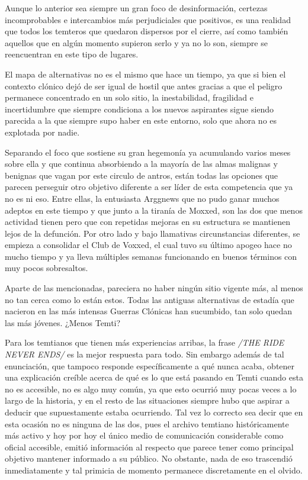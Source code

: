 \documentclass[
  spanish,
]{book}
\begin{document}
Aunque lo anterior sea siempre un gran foco de desinformación, certezas incomprobables e intercambios más perjudiciales que positivos, es una realidad que todos los temteros que quedaron dispersos por el cierre, así como también aquellos que en algún momento supieron serlo y ya no lo son, siempre se reencuentran en este tipo de lugares.

El mapa de alternativas no es el mismo que hace un tiempo, ya que si bien el contexto clónico dejó de ser igual de hostil que antes gracias a que el peligro permanece concentrado en un solo sitio, la inestabilidad, fragilidad e incertidumbre que siempre condiciona a los nuevos aspirantes sigue siendo parecida a la que siempre supo haber en este entorno, solo que ahora no es explotada por nadie.

Separando el foco que sostiene su gran hegemonía ya acumulando varios meses sobre ella y que continua absorbiendo a la mayoría de las almas malignas y benignas que vagan por este circulo de antros, están todas las opciones que parecen perseguir otro objetivo diferente a ser líder de esta competencia que ya no es ni eso. Entre ellas, la entusiasta Arggnews que no pudo ganar muchos adeptos en este tiempo y que junto a la tiranía de Moxxed, son las dos que menos actividad tienen pero que con repetidas mejoras en su estructura se mantienen lejos de la defunción. Por otro lado y bajo llamativas circunstancias diferentes, se empieza a consolidar el Club de Voxxed, el cual tuvo su último apogeo hace no mucho tiempo y ya lleva múltiples semanas funcionando en buenos términos con muy pocos sobresaltos.

Aparte de las mencionadas, pareciera no haber ningún sitio vigente más, al menos no tan cerca como lo están estos. Todas las antiguas alternativas de estadía que nacieron en las más intensas Guerras Clónicas han sucumbido, tan solo quedan las más jóvenes. ¿Menos Temti?

Para los temtianos que tienen más experiencias arribas, la frase \emph{/THE RIDE NEVER ENDS/} es la mejor respuesta para todo. Sin embargo además de tal enunciación, que tampoco responde específicamente a qué nunca acaba, obtener una explicación creíble acerca de qué es lo que está pasando en Temti cuando esta no es accesible, no es algo muy común, ya que esto ocurrió muy pocas veces a lo largo de la historia, y en el resto de las situaciones siempre hubo que aspirar a deducir que supuestamente estaba ocurriendo. Tal vez lo correcto sea decir que en esta ocasión no es ninguna de las dos, pues el archivo temtiano históricamente más activo y hoy por hoy el único medio de comunicación considerable como oficial accesible, emitió información al respecto que parece tener como principal objetivo mantener informado a su público. No obstante, nada de eso trascendió inmediatamente y tal primicia de momento permanece discretamente en el olvido.
\end{document}
